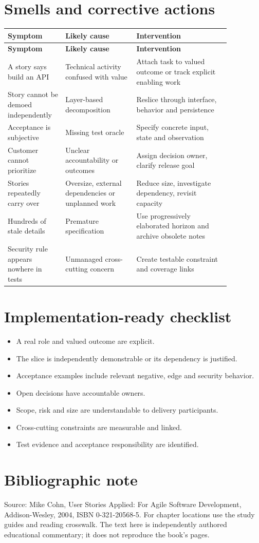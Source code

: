\documentclass[11pt,letterpaper]{article}
\begin{document}
\section{Smells and corrective actions}
\begin{longtable}{|p{0.20\linewidth}|p{0.29\linewidth}|p{0.37\linewidth}|}\hline
\textbf{Symptom} & \textbf{Likely cause} & \textbf{Intervention} \\ \hline\endfirsthead\hline
\textbf{Symptom} & \textbf{Likely cause} & \textbf{Intervention} \\ \hline\endhead
A story says build an API & Technical activity confused with value & Attach task to valued outcome or track explicit enabling work \\ \hline
Story cannot be demoed independently & Layer-based decomposition & Reslice through interface, behavior and persistence \\ \hline
Acceptance is subjective & Missing test oracle & Specify concrete input, state and observation \\ \hline
Customer cannot prioritize & Unclear accountability or outcomes & Assign decision owner, clarify release goal \\ \hline
Stories repeatedly carry over & Oversize, external dependencies or unplanned work & Reduce size, investigate dependency, revisit capacity \\ \hline
Hundreds of stale details & Premature specification & Use progressively elaborated horizon and archive obsolete notes \\ \hline
Security rule appears nowhere in tests & Unmanaged cross-cutting concern & Create testable constraint and coverage links \\ \hline
\end{longtable}
\section{Implementation-ready checklist}
\begin{itemize}[leftmargin=*,itemsep=2pt]
\item A real role and valued outcome are explicit.
\item The slice is independently demonstrable or its dependency is justified.
\item Acceptance examples include relevant negative, edge and security behavior.
\item Open decisions have accountable owners.
\item Scope, risk and size are understandable to delivery participants.
\item Cross-cutting constraints are measurable and linked.
\item Test evidence and acceptance responsibility are identified.
\end{itemize}
\section{Bibliographic note}
Source: Mike Cohn, User Stories Applied: For Agile Software Development, Addison-Wesley, 2004, ISBN 0-321-20568-5. For chapter locations use the study guides and reading crosswalk. The text here is independently authored educational commentary; it does not reproduce the book’s pages.
\end{document}
